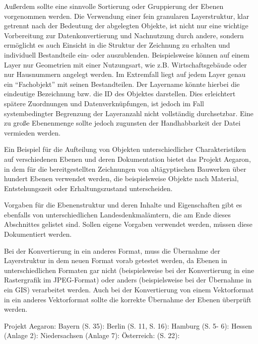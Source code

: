 Außerdem sollte eine sinnvolle Sortierung oder Gruppierung der Ebenen vorgenommen werden. Die Verwendung einer fein granularen Layerstruktur, klar getrennt nach der Bedeutung der abgelegten Objekte, ist nicht nur eine wichtige Vorbereitung zur Datenkonvertierung und Nachnutzung durch andere, sondern ermöglicht es auch Einsicht in die Struktur der Zeichnung zu erhalten und individuell Bestandteile ein- oder auszublenden. Beispielsweise können auf einem Layer nur Geometrien mit einer Nutzungsart, wie z.B. Wirtschaftsgebäude oder nur  Hausnummern angelegt werden. Im Extremfall liegt auf jedem Layer genau ein "`Fachobjekt"' mit seinen Bestandteilen. Der Layername könnte hierbei die eindeutige Bezeichnung bzw. die ID des Objektes darstellen. Dies erleichtert spätere Zuordnungen und Datenverknüpfungen, ist jedoch im Fall systembedingter Begrenzung der Layeranzahl nicht vollständig durchsetzbar. Eine zu große Ebenenmenge sollte jedoch zugunsten der Handhabbarkeit der Datei vermieden werden. 

Ein Beispiel für die Aufteilung von Objekten unterschiedlicher Charakteristiken auf verschiedenen Ebenen und deren Dokumentation bietet das Projekt Aegaron, in dem für die bereitgestellten Zeichnungen von altägyptischen Bauwerken über hundert Ebenen verwendet werden, die beispielsweise Objekte nach Material, Entstehungszeit oder Erhaltungszustand unterscheiden.

Vorgaben für die Ebenenstruktur und deren Inhalte und Eigenschaften gibt es ebenfalls von unterschiedlichen Landesdenkmalämtern, die am Ende dieses Abschnittes gelistet sind. Sollen eigene Vorgaben verwendet werden, müssen diese Dokumentiert werden.

Bei der Konvertierung in ein anderes Format, muss die Übernahme der Layerstruktur in dem neuen Format vorab getestet werden, da Ebenen in unterschiedlichen Formaten gar nicht (beispielsweise bei der Konvertierung in eine Rastergrafik im JPEG-Format) oder anders (beispielsweise bei der Übernahme in ein GIS) verarbeitet werden. Auch bei der Konvertierung von einem Vektorformat in ein anderes Vektorformat sollte die korrekte Übernahme der Ebenen überprüft werden.

\begin{flushleft}
	Projekt Aegaron:  
	Bayern (S. 35): 
	Berlin (S. 11, S. 16): 
	Hamburg (S. 5- 6): 
	Hessen (Anlage 2): 
	Niedersachsen (Anlage 7): 
	Österreich: (S. 22): 
\end{flushleft}

